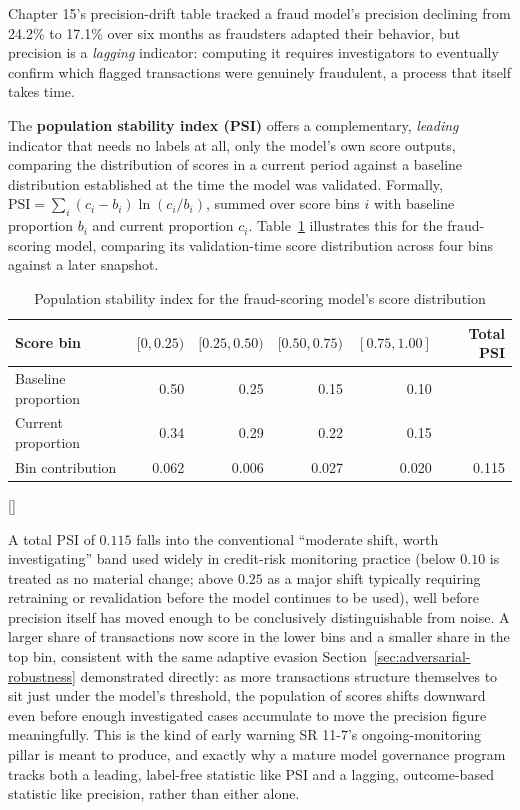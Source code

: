\documentclass[../ai_in_finance]{subfiles}
\begin{document}
Chapter 15's precision-drift table tracked a fraud model's precision declining from 24.2\% to 17.1\% over six months as fraudsters adapted their behavior, but precision is a \emph{lagging} indicator: computing it requires investigators to eventually confirm which flagged transactions were genuinely fraudulent, a process that itself takes time.

The \textbf{population stability index (PSI)} offers a complementary, \emph{leading} indicator that needs no labels at all, only the model's own score outputs, comparing the distribution of scores in a current period against a baseline distribution established at the time the model was validated. Formally, $\text{PSI} = \sum_{i} (c_i - b_i) \ln(c_i / b_i)$, summed over score bins $i$ with baseline proportion $b_i$ and current proportion $c_i$. Table~\ref{tab:psi_monitoring} illustrates this for the fraud-scoring model, comparing its validation-time score distribution across four bins against a later snapshot.

\begin{table}[htbp]
\centering
\begin{lrbox}{\bookmeasuredbox}
\begin{tabular}{lrrrrr}
\toprule
Score bin & $[0, 0.25)$ & $[0.25, 0.50)$ & $[0.50, 0.75)$ & $[0.75, 1.00]$ & Total PSI \\
\midrule
Baseline proportion & 0.50 & 0.25 & 0.15 & 0.10 & \\
Current proportion & 0.34 & 0.29 & 0.22 & 0.15 & \\
Bin contribution & 0.062 & 0.006 & 0.027 & 0.020 & 0.115 \\
\bottomrule
\end{tabular}
\end{lrbox}
\ifdim\wd\bookmeasuredbox<0.65\linewidth
\setlength{\bookcapwidth}{0.65\linewidth}
\else
\setlength{\bookcapwidth}{\wd\bookmeasuredbox}
\fi
{}[\bookcapwidth]{
\usebox{\bookmeasuredbox}
}{
\caption{Population stability index for the fraud-scoring model's score distribution}
\label{tab:psi_monitoring}
}
\end{table}

A total PSI of $0.115$ falls into the conventional ``moderate shift, worth investigating'' band used widely in credit-risk monitoring practice (below $0.10$ is treated as no material change; above $0.25$ as a major shift typically requiring retraining or revalidation before the model continues to be used), well before precision itself has moved enough to be conclusively distinguishable from noise. A larger share of transactions now score in the lower bins and a smaller share in the top bin, consistent with the same adaptive evasion Section~\ref{sec:adversarial-robustness} demonstrated directly: as more transactions structure themselves to sit just under the model's threshold, the population of scores shifts downward even before enough investigated cases accumulate to move the precision figure meaningfully. This is the kind of early warning SR 11-7's ongoing-monitoring pillar is meant to produce, and exactly why a mature model governance program tracks both a leading, label-free statistic like PSI and a lagging, outcome-based statistic like precision, rather than either alone.
\end{document}
